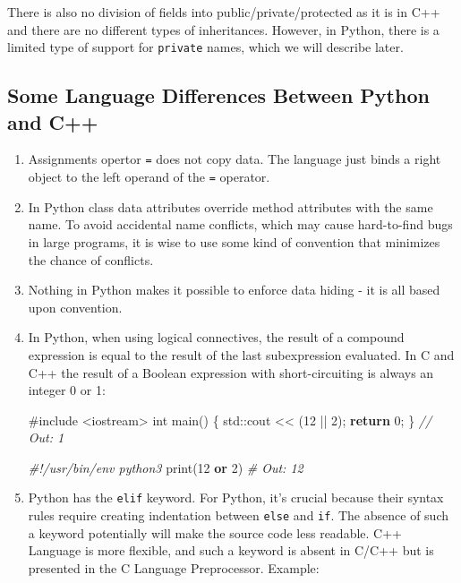 \documentclass[
]{article}
\newenvironment{Shaded}{}{}
\newcommand{\BuiltInTok}[1]{#1}
\newcommand{\CommentTok}[1]{\textcolor[rgb]{0.38,0.63,0.69}{\textit{#1}}}
\newcommand{\ControlFlowTok}[1]{\textcolor[rgb]{0.00,0.44,0.13}{\textbf{#1}}}
\newcommand{\DataTypeTok}[1]{\textcolor[rgb]{0.56,0.13,0.00}{#1}}
\newcommand{\DecValTok}[1]{\textcolor[rgb]{0.25,0.63,0.44}{#1}}
\newcommand{\ImportTok}[1]{#1}
\newcommand{\KeywordTok}[1]{\textcolor[rgb]{0.00,0.44,0.13}{\textbf{#1}}}
\newcommand{\NormalTok}[1]{#1}
\newcommand{\OperatorTok}[1]{\textcolor[rgb]{0.40,0.40,0.40}{#1}}
\newcommand{\PreprocessorTok}[1]{\textcolor[rgb]{0.74,0.48,0.00}{#1}}
\begin{document}
There is also no division of fields into public/private/protected as it
is in C++ and there are no different types of inheritances. However, in
Python, there is a limited type of support for \texttt{private} names,
which we will describe later.

\hypertarget{some-language-differences-between-python-and-c}{%
\subsection{Some Language Differences Between Python and
C++}\label{some-language-differences-between-python-and-c}}

\begin{enumerate}
\def\labelenumi{\arabic{enumi}.}
\item
  Assignments opertor \texttt{=} does not copy data. The language just
  binds a right object to the left operand of the \texttt{=} operator.
\item
  In Python class data attributes override method attributes with the
  same name. To avoid accidental name conflicts, which may cause
  hard-to-find bugs in large programs, it is wise to use some kind of
  convention that minimizes the chance of conflicts.
\item
  Nothing in Python makes it possible to enforce data hiding - it is all
  based upon convention.
\item
  In Python, when using logical connectives, the result of a compound
  expression is equal to the result of the last subexpression evaluated.
  In C and C++ the result of a Boolean expression with short-circuiting
  is always an integer 0 or 1:

\begin{Shaded}
\begin{Highlighting}[]
\PreprocessorTok{\#include }\ImportTok{\textless{}iostream\textgreater{}}
\DataTypeTok{int}\NormalTok{ main}\OperatorTok{()} \OperatorTok{\{}
    \BuiltInTok{std::}\NormalTok{cout}\OperatorTok{ \textless{}\textless{}} \OperatorTok{(}\DecValTok{12} \OperatorTok{||} \DecValTok{2}\OperatorTok{);}
    \ControlFlowTok{return} \DecValTok{0}\OperatorTok{;}
\OperatorTok{\}}
\CommentTok{// Out: 1}
\end{Highlighting}
\end{Shaded}

\begin{Shaded}
\begin{Highlighting}[]
\CommentTok{\#!/usr/bin/env python3}
\BuiltInTok{print}\NormalTok{(}\DecValTok{12} \KeywordTok{or} \DecValTok{2}\NormalTok{)}
\CommentTok{\# Out: 12}
\end{Highlighting}
\end{Shaded}
\item
  Python has the \texttt{elif} keyword. For Python, it's crucial because
  their syntax rules require creating indentation between \texttt{else}
  and \texttt{if}. The absence of such a keyword potentially will make
  the source code less readable. C++ Language is more flexible, and such
  a keyword is absent in C/C++ but is presented in the C Language
  Preprocessor. Example:


\end{enumerate}
\end{document}
